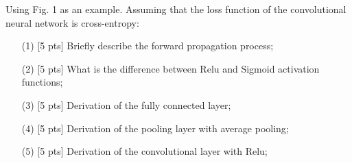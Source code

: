 \begin{problem}
    Using Fig. 1 as an example. Assuming that the loss function of the convolutional neural network is cross-entropy:
    \begin{enumerate}
        \item[(1)][5 pts] Brieﬂy describe the forward propagation process;
        \item[(2)][5 pts] What is the diﬀerence between Relu and Sigmoid activation functions;
        \item[(3)][5 pts] Derivation of the fully connected layer;
        \item[(4)][5 pts] Derivation of the pooling layer with average pooling;
        \item[(5)][5 pts] Derivation of the convolutional layer with Relu;
    \end{enumerate}
\end{problem}



